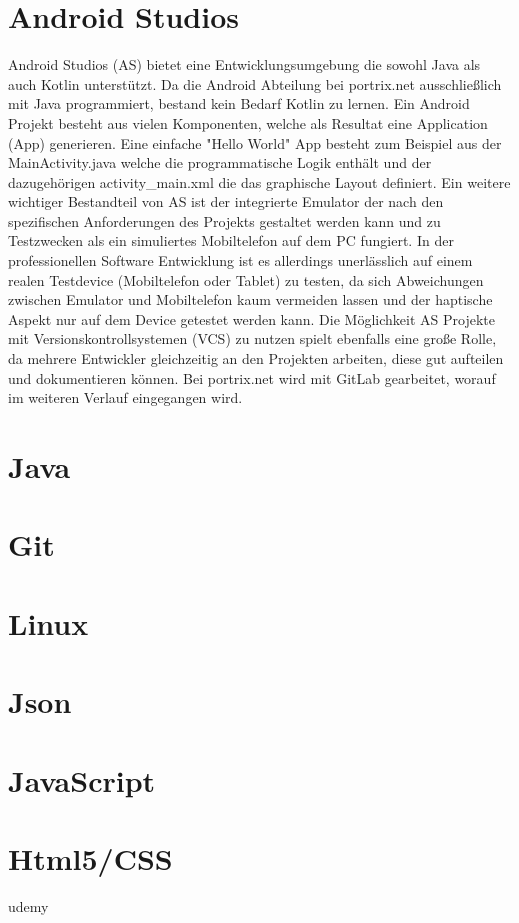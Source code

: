 \section{Android Studios}
Android Studios (AS) bietet eine Entwicklungsumgebung die sowohl Java als auch Kotlin unterst\"utzt. Da die Android Abteilung bei portrix.net ausschlie\ss{}lich mit Java programmiert, bestand kein Bedarf Kotlin zu lernen.
Ein Android Projekt besteht aus vielen Komponenten, welche als Resultat eine Application (App) generieren. Eine einfache "Hello World" App besteht zum Beispiel aus der MainActivity.java welche die programmatische Logik enth\"alt und der dazugeh\"origen activity\_main.xml die das graphische Layout definiert.
Ein weitere wichtiger Bestandteil von AS ist der integrierte Emulator der nach den spezifischen Anforderungen des Projekts gestaltet werden kann und zu Testzwecken als ein simuliertes Mobiltelefon auf dem PC fungiert. In der professionellen Software Entwicklung ist es allerdings unerl\"asslich auf einem realen Testdevice (Mobiltelefon oder Tablet) zu testen, da sich Abweichungen zwischen Emulator und Mobiltelefon kaum vermeiden lassen und der haptische Aspekt nur auf dem Device getestet werden kann.
Die M\"oglichkeit AS Projekte mit Versionskontrollsystemen (VCS) zu nutzen spielt ebenfalls eine gro\ss{}e Rolle, da mehrere Entwickler gleichzeitig an den Projekten arbeiten, diese gut aufteilen und dokumentieren k\"onnen. Bei portrix.net wird mit GitLab gearbeitet, worauf im weiteren Verlauf eingegangen wird.

\section{Java}

\section{Git}
\section{Linux}
\section{Json}
\section{JavaScript}
\section{Html5/CSS}

udemy

